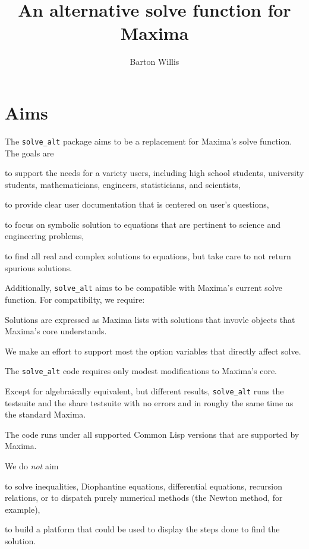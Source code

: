 \documentclass[]{scrartcl}
\title{An alternative solve function for Maxima}
\author{Barton Willis}
\newcommand{\altsolve}{\texttt{solve\_alt}}
\begin{document}
\maketitle

\section{Aims}


The \altsolve\/ package aims to be a replacement for Maxima's solve function. The goals are

\begin{alphalist}[]

\item to support the needs for a variety users, including high school students, university students, mathematicians, engineers, statisticians, and scientists,

\item to provide clear user documentation that is centered  on user's questions,

\item to focus on symbolic solution to equations that are pertinent to science and engineering problems,

\item to find all real and complex solutions to equations, but take care to not return spurious solutions.

\end{alphalist}
Additionally, \altsolve\/  aims to be compatible with Maxima's current solve function. For compatibilty, we require:

\begin{alphalist}[]

\item Solutions are expressed as Maxima lists with solutions that invovle objects that Maxima's core  understands.

\item We make an effort to support most the option variables that directly affect solve.

 \item The \altsolve\/ code requires only modest modifications to Maxima's core.

\item Except for algebraically equivalent, but different results, \altsolve\/  runs the testsuite and the share testsuite with no errors and in roughy the same time as the standard Maxima.

\item The code runs under all supported Common Lisp versions that are supported by Maxima.
\end{alphalist}
We do \emph{not} aim
\begin{alphalist}[]

\item to solve inequalities, Diophantine equations, differential equations, recursion relations, or to dispatch purely numerical methods (the Newton method, for example),

\item to build a platform that could be used to display the steps done to find the solution.

\end{alphalist}
\end{document}
